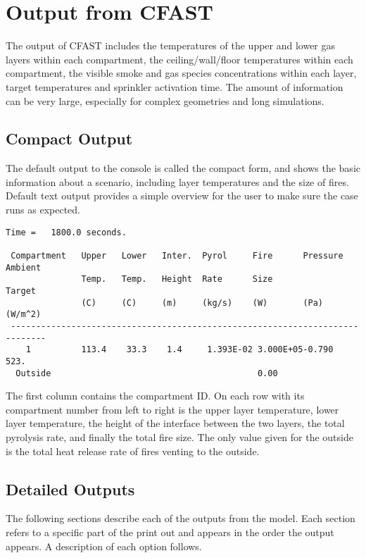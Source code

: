 \chapter{Output from CFAST}
\label{Output_Chapter}

The output of CFAST includes the temperatures of the upper and lower gas layers within each compartment, the ceiling/wall/floor temperatures within each compartment, the visible smoke and gas species concentrations within each layer, target temperatures and sprinkler activation time.  The amount of information can be very large, especially for complex geometries and long simulations.

\section{Compact Output}

The default output to the console is called the compact form, and shows the basic information about a scenario, including layer temperatures and the size of fires. Default text output provides a simple overview for the user to make sure the case runs as expected.
\begin{lstlisting}[basicstyle=\scriptsize]
 Time =   1800.0 seconds.

 Compartment   Upper   Lower   Inter.  Pyrol     Fire      Pressure  Ambient
               Temp.   Temp.   Height  Rate      Size                Target
               (C)     (C)     (m)     (kg/s)    (W)       (Pa)      (W/m^2)
 -----------------------------------------------------------------------------
    1          113.4    33.3    1.4     1.393E-02 3.000E+05-0.790      523.
  Outside                                         0.00
\end{lstlisting}
The first column contains the compartment ID.  On each row with its compartment number from left to right is the upper layer temperature, lower layer temperature, the height of the interface between the two layers, the total pyrolysis rate, and finally the total fire size.  The only value given for the outside is the total heat release rate of fires venting to the outside.

\section{Detailed Outputs}

The following sections describe each of the outputs from the model.  Each section refers to a specific part of the print out and appears in the order the output appears. A description of each option follows.

